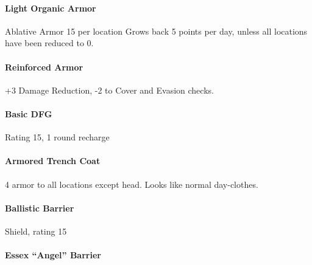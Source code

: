 \documentclass{article}
\begin{document}
\paragraph{Light Organic Armor}\label{sec-light-organic-armor}%

\noindent{}Ablative Armor 15 per location\mdbr
{}Grows back 5 points per day, unless all locations have been reduced to 0.%

\paragraph{Reinforced Armor}\label{sec-reinforced-armor}%

\noindent{}+3 Damage Reduction, -2 to Cover and Evasion checks.%

\paragraph{Basic DFG}\label{sec-basic-dfg}%

\noindent{}Rating 15, 1 round recharge%

\paragraph{Armored Trench Coat}\label{sec-armored-trench-coat}%

\noindent{}4 armor to all locations except head. Looks like normal day-clothes.%

\paragraph{Ballistic Barrier}\label{sec-ballistic-barrier}%

\noindent{}Shield, rating 15%

\paragraph{Essex \textquotedblleft{}Angel\textquotedblright{} Barrier}\label{sec-essex-angel-barrier}%
\end{document}
